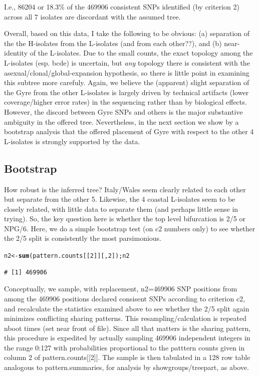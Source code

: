\documentclass{article}\usepackage[]{graphicx}\usepackage[]{color}
\makeatletter
\newcommand{\hlnum}[1]{\textcolor[rgb]{0.686,0.059,0.569}{#1}}%
\newcommand{\hlstd}[1]{\textcolor[rgb]{0.345,0.345,0.345}{#1}}%
\newcommand{\hlkwb}[1]{\textcolor[rgb]{0.69,0.353,0.396}{#1}}%
\newcommand{\hlkwd}[1]{\textcolor[rgb]{0.737,0.353,0.396}{\textbf{#1}}}%
\newenvironment{kframe}{%
 \def\at@end@of@kframe{}%
 \ifinner\ifhmode%
  \def\at@end@of@kframe{\end{minipage}}%
  \begin{minipage}{\columnwidth}%
 \fi\fi%
 \def\FrameCommand##1{\hskip\@totalleftmargin \hskip-\fboxsep
 \colorbox{shadecolor}{##1}\hskip-\fboxsep
     \hskip-\linewidth \hskip-\@totalleftmargin \hskip\columnwidth}%
 \MakeFramed {\advance\hsize-\width
   \@totalleftmargin\z@ \linewidth\hsize
   \@setminipage}}%
 {\par\unskip\endMakeFramed%
 \at@end@of@kframe}
\newenvironment{knitrout}{}{} %
\makeatother
\begin{document}
I.e., 86204 or 18.3\% of the 469906 consistent SNPs identified (by criterion 2) across all 7 isolates are discordant with the assumed tree.

Overall, based on this data, I take the following to be obvious: (a) separation of the the H-isolates from the L-isolates (and from each other??), and (b) near-identity of the L-isolates.  Due to the small counts, the exact topology among the L-isolates (esp. bcde) is uncertain, but \emph{any} topology there is consistent with the asexual/clonal/global-expansion hypothesis, so there is little point in examining this subtree more carefuly. Again, we believe the (apparent) slight separation of the Gyre from the other L-isolates is largely driven by technical artifacts (lower coverage/higher error rates) in the sequencing rather than by biological effects.  However, the discord between Gyre SNPs and others is the major substantive ambiguity in the offered tree.  Nevertheless, in the next section we show by a bootstrap analysis that the offered placement of Gyre with respect to the other 4 L-isolates is strongly supported by the data.

\subsection{Bootstrap}
How robust is the inferred tree?  Italy/Wales seem clearly related to each other but separate from the other 5.
Likewise, the 4 coastal L-isolates seem to be closely related, with little data to separate them (and perhaps little sense in
trying).  So, the key question here is whether the top level bifurcation is 2/5 or NPG/6.  Here, we do a simple
bootstrap test (on c2 numbers only) to see whether the 2/5 split is consistently the most parsimonious.

\begin{knitrout}\footnotesize
{}\color{fgcolor}\begin{kframe}
\begin{alltt}
\hlstd{n2} \hlkwb{<-} \hlkwd{sum}\hlstd{(pattern.counts[[}\hlnum{2}\hlstd{]][,}\hlnum{2}\hlstd{]); n2}
\end{alltt}
\begin{verbatim}
# [1] 469906
\end{verbatim}
\end{kframe}
\end{knitrout}

Conceptually, we sample, with replacement, n2=469906 SNP positions from among the
469906 positions declared consisent SNPs according to criterion c2, and recalculate the
statistics examined above to see whether the 2/5 split again minimizes conflicting sharing patterns.  This
resampling/calculation is repeated nboot times (set near front of file). Since all that matters is the sharing pattern, this
procedure is expedited by actually sampling 469906 independent integers in the range 0:127 with
probabilities proportional to the patttern counts given in column 2 of pattern.counts[[2]].  The sample is then
tabulated in a 128 row table analogous to pattern.summaries, for analysis by showgroups/treepart, as above.
\end{document}
